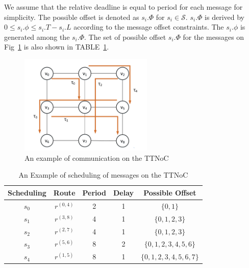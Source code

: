 \documentclass[journal]{IEEEtran}
\newcommand{\calS}{\mathcal{S}}
\theoremstyle{remark}
\begin{document}
We assume that the relative deadline is equal to period for each message for simplicity.
The possible offset is denoted as $s_i.\Phi$ for $s_i\in\calS$.
$s_i.\Phi$ is derived by $ 0 \leq s_{i}.\phi \leq s_{i}.T - s_{i}.L $ according to the message offset constraints.
The $s_i.\phi$ is generated among the $s_i.\Phi$.
The set of possible offset $s_i.\Phi$ for the messages on Fig~\ref{f:comm_on_TTNoC} is also shown in TABLE~\ref{t:comm_info}.
\begin{figure}[!t]
	\centering
	\includegraphics[width=2.5in]{picture/scheduling_example.pdf}
	\caption{An example of communication on the TTNoC}
	\label{f:comm_on_TTNoC}
	
\end{figure}
\begin{table}[!t]
	\renewcommand{\arraystretch}{1.3}
		\newcommand{\tabincell}[2]{\begin{tabular}{@{}#1@{}}#2\end{tabular}}
	\caption{An Example of scheduling of messages on the TTNoC}
	\label{t:comm_info}
	\centering
	\begin{tabular}{|c||c||c||c||c|}
		\hline
			\textbf{Scheduling } & 
			\textbf{Route } & 
			\textbf{Period} & 
			\textbf{Delay } & 
			\textbf{Possible Offset}\\
		\hline
		$s_{0}$ & $ r^{(0,4)} $ & 2 & 1 & $\{0,1\}$\\
		\hline
		$s_{1}$ & $ r^{(3,8)} $ & 4 & 1 & $\{0,1,2,3\}$\\
		\hline
		$s_{2}$ & $ r^{(2,7) }$ & 4 & 1 & $\{0,1,2,3\}$\\
		\hline		
		$s_{3}$ & $ r^{(5,6) }$ & 8 & 2 & $\{0,1,2,3,4,5,6\}$\\
		\hline
		$s_{4}$ & $ r^{(1,5) }$ & 8 & 1 & $\{0,1,2,3,4,5,6,7\}$\\
		\hline		
	\end{tabular}
\end{table}
\end{document}
